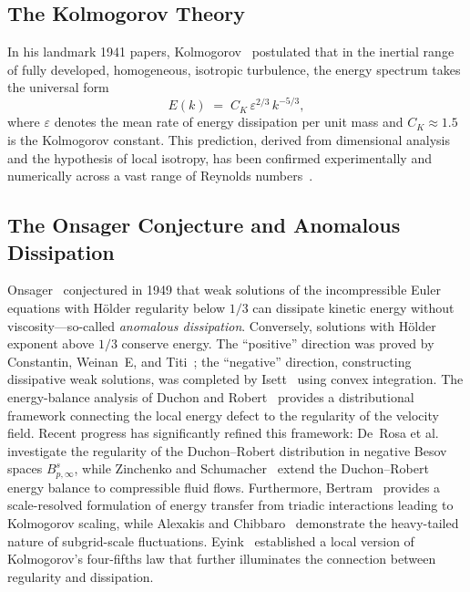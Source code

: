 \documentclass[12pt,a4paper]{article}
\theoremstyle{breakdef}
\theoremstyle{breakplain}
\theoremstyle{breakdef}
\begin{document}
\subsection{The Kolmogorov Theory}

In his landmark 1941 papers, Kolmogorov~\cite{K41a,K41b} postulated that
in the inertial range of fully developed, homogeneous, isotropic
turbulence, the energy spectrum takes the universal form
\begin{equation}\label{eq:K41}
  E(k) \;=\; C_K \,\varepsilon^{2/3}\, k^{-5/3},
\end{equation}
where $\varepsilon$ denotes the mean rate of energy dissipation per unit
mass and $C_K \approx 1.5$ is the Kolmogorov constant.  This prediction,
derived from dimensional analysis and the hypothesis of local isotropy,
has been confirmed experimentally and numerically across a vast range of
Reynolds numbers~\cite{Frisch95,Pope00}.

\subsection{The Onsager Conjecture and Anomalous Dissipation}

Onsager~\cite{Onsager49} conjectured in 1949 that weak solutions of the
incompressible Euler equations with Hölder regularity below $1/3$ can
dissipate kinetic energy without viscosity---so-called \emph{anomalous
dissipation}.  Conversely, solutions with Hölder exponent above $1/3$
conserve energy.  The ``positive'' direction was proved by
Constantin, Weinan~E, and Titi~\cite{CET94}; the ``negative'' direction,
constructing dissipative weak solutions, was completed by
Isett~\cite{Isett18} using convex integration.  The energy-balance
analysis of Duchon and Robert~\cite{DR00} provides a distributional
framework connecting the local energy defect to the regularity of the
velocity field.  Recent progress has significantly refined this framework: De~Rosa et al.~\cite{DeRosaetAl2026Besov} investigate the regularity of the Duchon--Robert distribution in negative Besov spaces $B^s_{p,\infty}$, while Zinchenko and Schumacher~\cite{ZinchenkoSchumacher2026} extend the Duchon--Robert energy balance to compressible fluid flows. Furthermore, Bertram~\cite{Bertram2026} provides a scale-resolved formulation of energy transfer from triadic interactions leading to Kolmogorov scaling, while Alexakis and Chibbaro~\cite{AlexakisChibbaro2025} demonstrate the heavy-tailed nature of subgrid-scale fluctuations. Eyink~\cite{Eyink03} established a local version of
Kolmogorov's four-fifths law that further illuminates the connection
between regularity and dissipation.
\end{document}
